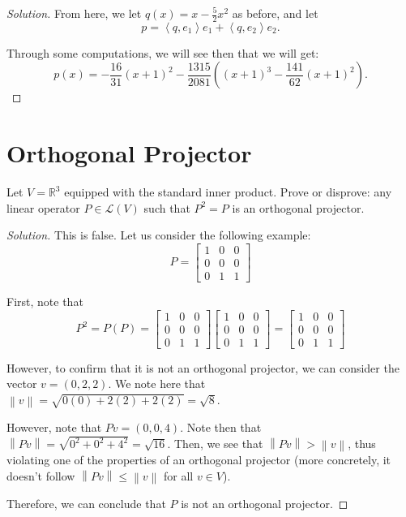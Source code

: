 \documentclass{article}
\newenvironment{solution}{\begin{proof}[Solution]}{\end{proof}}
\newcommand{\norm}[1]{\left\lVert{#1}\right\rVert}
\newcommand{\RR}{\mathbb{R}}
\newcommand{\innerproduct}[2]{\left\langle{#1}, {#2}\right\rangle}
\begin{document}
\begin{solution}
		From here, we let $q(x) = x - \frac{5}{2}x^{2}$ as before, and let
		\begin{equation*}
			p = \innerproduct{q}{e_{1}}e_{1} + \innerproduct{q}{e_{2}}e_{2}.
		\end{equation*}
		
		Through some computations, we will see then that we will get:
		\begin{equation*}
			p(x) = -\frac{16}{31}(x+1)^{2} - \frac{1315}{2081}\left( (x+1)^{3} - \frac{141}{62}(x+1)^{2} \right).
		\end{equation*}
		
	\end{solution}
	
	\newpage
	
	\section{Orthogonal Projector}
	\begin{hw}
		Let $V = \RR^{3}$ equipped with the standard inner product. Prove or disprove: any linear operator $P \in \mathcal{L}(V)$ such that $P^{2} = P$ is an orthogonal projector.
	\end{hw}
	\begin{solution}
		This is false. Let us consider the following example:
		\begin{equation*}
			P = \begin{bmatrix}
				1 & 0 & 0 \\ 0 & 0 & 0 \\ 0 & 1 & 1
			\end{bmatrix}
		\end{equation*}
		
		First, note that
		\begin{equation*}
			P^{2} = P(P) = \begin{bmatrix}
				1 & 0 & 0 \\ 0 & 0 & 0 \\ 0 & 1 & 1
			\end{bmatrix}
			\begin{bmatrix}
				1 & 0 & 0 \\ 0 & 0 & 0 \\ 0 & 1 & 1
			\end{bmatrix}
			= \begin{bmatrix}
				1 & 0 & 0 \\ 0 & 0 & 0 \\ 0 & 1 & 1
			\end{bmatrix}
		\end{equation*}
		
		However, to confirm that it is not an orthogonal projector, we can consider the vector $v = (0,2,2)$. We note here that $\norm{v} = \sqrt{0(0) + 2(2) + 2(2)} = \sqrt{8}$.
		
		However, note that $Pv = (0,0,4)$. Note then that $\norm{Pv} = \sqrt{0^{2} + 0^{2} + 4^{2}} = \sqrt{16}$. Then, we see that $\norm{Pv} > \norm{v}$, thus violating one of the properties of an orthogonal projector (more concretely, it doesn't follow $\norm{Pv} \leq \norm{v}$ for all $v \in V$).
		
		Therefore, we can conclude that $P$ is not an orthogonal projector.
	\end{solution}
\end{document}

